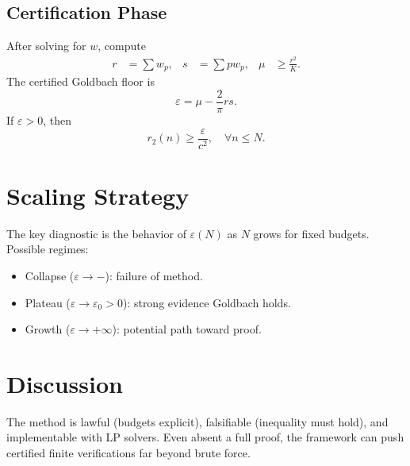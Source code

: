 \documentclass[11pt]{article}
\begin{document}
\subsection{Certification Phase}
After solving for $w$, compute
\begin{align}
    r &= \sum w_p, & s &= \sum p w_p, & \mu &\ge \frac{r^2}{K}.
\end{align}
The certified Goldbach floor is
\begin{equation}
    \varepsilon = \mu - \frac{2}{\pi}rs.
\end{equation}
If $\varepsilon>0$, then
\begin{equation}
    r_2(n) \ge \frac{\varepsilon}{c^2}, \quad \forall n \le N.
\end{equation}

\section{Scaling Strategy}
The key diagnostic is the behavior of $\varepsilon(N)$ as $N$ grows for fixed budgets. Possible regimes:
\begin{itemize}
    \item Collapse ($\varepsilon\to -$): failure of method.
    \item Plateau ($\varepsilon \to \varepsilon_0 >0$): strong evidence Goldbach holds.
    \item Growth ($\varepsilon \to +\infty$): potential path toward proof.
\end{itemize}

\section{Discussion}
The method is lawful (budgets explicit), falsifiable (inequality must hold), and implementable with LP solvers. Even absent a full proof, the framework can push certified finite verifications far beyond brute force.
\end{document}
